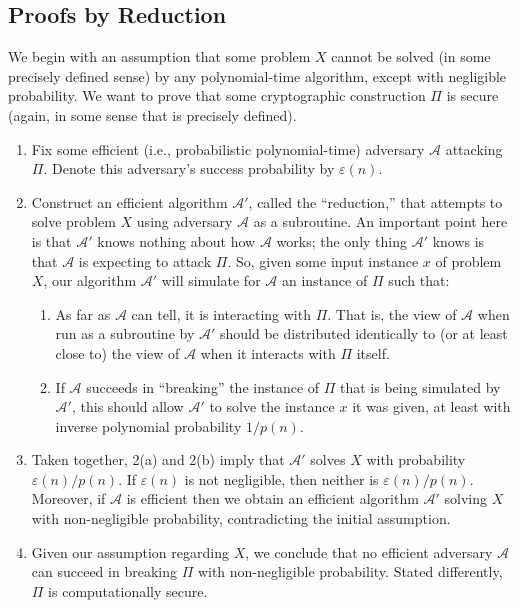 \subsection*{Proofs by Reduction}
We begin with an assumption that some problem $X$
 cannot be solved (in some precisely defined sense) by any polynomial-time
  algorithm, except with negligible probability. We want to prove that some
   cryptographic construction $\Pi$ is secure (again, in some sense that is 
   precisely defined).
   \begin{enumerate}
       \item Fix some efficient (i.e., probabilistic polynomial-time)
        adversary $\mathcal{A}$ attacking $\Pi$. Denote this adversary’s
         success probability by $\varepsilon(n)$.
       \item Construct an efficient algorithm $\mathcal{A}'$, called the “reduction,” 
       that attempts to solve problem $X$ using adversary $\mathcal{A}$ as a 
       subroutine. An important point here is that $\mathcal{A}'$ knows nothing
        about how $\mathcal{A}$ works; the only thing $\mathcal{A}'$ knows 
        is that $\mathcal{A}$ is expecting to attack $\Pi$. So, given some input
         instance $x$ of problem $X$, our algorithm $\mathcal{A}'$ will simulate
          for $\mathcal{A}$ an instance of $\Pi$ such that:
          \begin{enumerate}
              \item As far as $\mathcal{A}$ can tell, it is interacting with 
              $\Pi$. That is, the view of $\mathcal{A}$ when run as a subroutine
               by $\mathcal{A}'$ should be distributed identically to 
               (or at least close to) the view of $\mathcal{A}$ when it
                interacts with $\Pi$ itself.
              \item If $\mathcal{A}$ succeeds in “breaking” the instance of 
              $\Pi$ that is being simulated by $\mathcal{A}'$, this should 
              allow $\mathcal{A}'$ to solve the instance $x$ it was given, 
              at least with inverse polynomial probability $1/p(n)$.
          \end{enumerate}
        \item Taken together, 2(a) and 2(b) imply that $\mathcal{A}'$ solves $X$
         with probability $\varepsilon(n)/p(n)$. If $\varepsilon(n)$ is not 
         negligible, then neither is $\varepsilon(n)/p(n)$. Moreover, 
         if $\mathcal{A}$ is efficient then we obtain an efficient algorithm 
         $\mathcal{A}'$ solving $X$ with non-negligible probability, 
         contradicting the initial assumption.
        \item Given our assumption regarding $X$, we conclude that no efficient 
        adversary $\mathcal{A}$ can succeed in breaking $\Pi$ with 
        non-negligible probability. Stated differently, 
        $\Pi$ is computationally secure.
   \end{enumerate}

